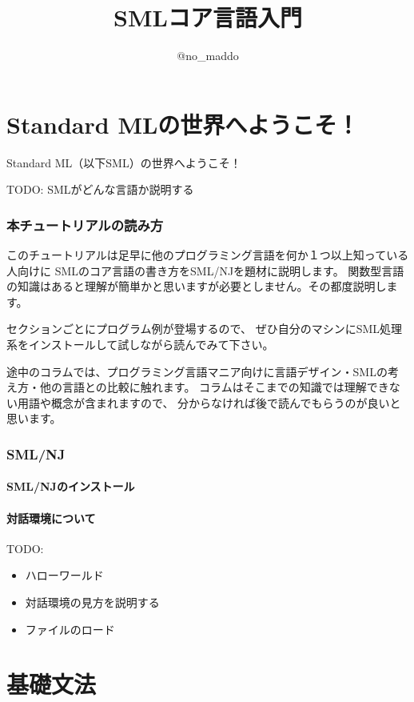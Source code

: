 \documentclass[11pt,a4paper]{article}
\title{SMLコア言語入門}
\author{@no\_maddo}
\begin{document}
\maketitle
\tableofcontents

\part{Standard MLの世界へようこそ！}
Standard ML（以下SML）の世界へようこそ！

TODO:
SMLがどんな言語か説明する

\section{本チュートリアルの読み方}
このチュートリアルは足早に他のプログラミング言語を何か１つ以上知っている人向けに
SMLのコア言語の書き方をSML/NJを題材に説明します。
関数型言語の知識はあると理解が簡単かと思いますが必要としません。その都度説明します。

セクションごとにプログラム例が登場するので、
ぜひ自分のマシンにSML処理系をインストールして試しながら読んでみて下さい。

途中のコラムでは、プログラミング言語マニア向けに言語デザイン・SMLの考え方・他の言語との比較に触れます。
コラムはそこまでの知識では理解できない用語や概念が含まれますので、
分からなければ後で読んでもらうのが良いと思います。

\section{SML/NJ}
\subsection{SML/NJのインストール}
\subsection{対話環境について}
TODO:
\begin{itemize}
\item ハローワールド
\item 対話環境の見方を説明する
\item ファイルのロード
\end{itemize}

\subsection{}

\part{基礎文法}
\end{document}
